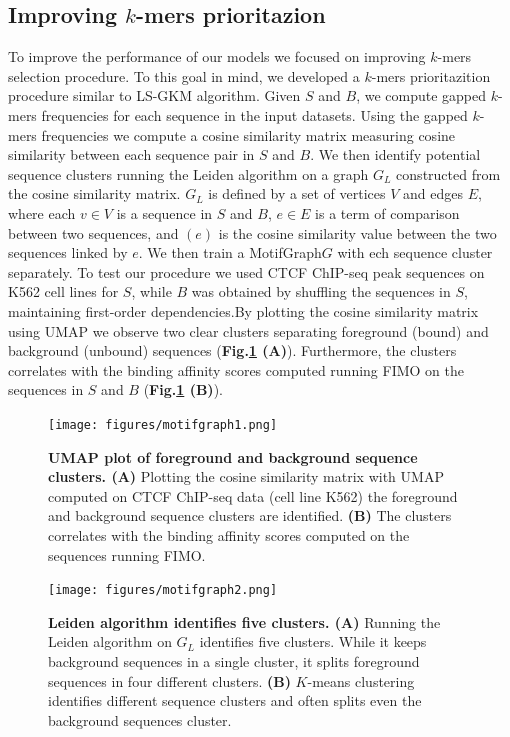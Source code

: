 \documentclass[a4paper, titlepage, openright]{book}
\newcommand{\motifgraph}{MotifGraph\xspace}
\begin{document}
\subsection{Improving $k$-mers prioritazion}
To improve the performance of our models we focused on improving $k$-mers selection procedure.  To this goal in mind, we developed a $k$-mers prioritazition procedure similar to LS-GKM algorithm. Given $S$ and $B$, we compute gapped $k$-mers frequencies for each sequence in the input datasets. Using the gapped $k$-mers frequencies we compute a cosine similarity matrix measuring cosine similarity between each sequence pair in $S$ and $B$.  We then identify potential sequence clusters running the Leiden algorithm \citep{traag2019louvain} on a graph $G_{L}$ constructed from the cosine similarity matrix. $G_{L}$ is defined by a set of vertices $V$ and edges $E$, where each $v \in V$ is a sequence in $S$ and $B$, $e \in E$ is a term of comparison between two sequences, and $(e)$ is the cosine similarity value between the two sequences linked by $e$. We then train a \motifgraph $G$ with ech sequence cluster separately.  To test our procedure we used CTCF ChIP-seq peak sequences on K562 cell lines for $S$, while $B$ was obtained by shuffling the sequences in $S$, maintaining first-order dependencies.By plotting the cosine similarity matrix using UMAP we observe two clear clusters separating foreground (bound) and background (unbound) sequences (\textbf{Fig.\ref{fig:motifgraph1} (A)}). Furthermore, the clusters correlates with the binding affinity scores computed running FIMO \citep{grant2011fimo} on the sequences in $S$ and $B$ (\textbf{Fig.\ref{fig:motifgraph1} (B)}).
\begin{figure}
	\centering
	\texttt{[image: figures/motifgraph1.png]}
	\caption[UMAP plot of foreground and background sequence clusters]{\textbf{UMAP plot of foreground and background sequence clusters. (A)} Plotting the cosine similarity matrix with UMAP computed on CTCF ChIP-seq data (cell line K562) the foreground and background sequence clusters are identified. \textbf{(B)} The  clusters correlates with the binding affinity scores computed on the sequences running FIMO.}
	\label{fig:motifgraph1}
\end{figure} 
\begin{figure}
	\centering
	\texttt{[image: figures/motifgraph2.png]}
	\caption[Leiden algorithm identifies five clusters]{\textbf{Leiden algorithm identifies five clusters. (A)} Running the Leiden algorithm on $G_{L}$ identifies five clusters. While it keeps background sequences in a single cluster, it splits foreground sequences in four different clusters. \textbf{(B)} $K$-means clustering identifies different sequence clusters and often splits even the background sequences cluster.}
	\label{fig:motifgraph2}
\end{figure} 
\end{document}
